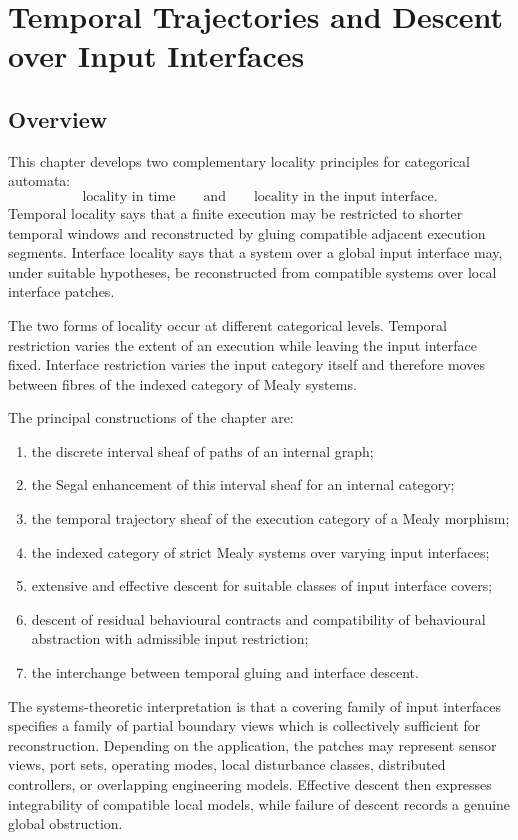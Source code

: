\chapter{Temporal Trajectories and Descent over Input Interfaces}
\label{ch:temporal-trajectories-interface-descent}

\section{Overview}
\label{sec:temporal-descent-overview}

This chapter develops two complementary locality principles for categorical
automata:
\[
    \text{locality in time}
    \qquad\text{and}\qquad
    \text{locality in the input interface}.
\]
Temporal locality says that a finite execution may be restricted to shorter
temporal windows and reconstructed by gluing compatible adjacent execution
segments. Interface locality says that a system over a global input interface
may, under suitable hypotheses, be reconstructed from compatible systems over
local interface patches.

The two forms of locality occur at different categorical levels. Temporal
restriction varies the extent of an execution while leaving the input
interface fixed. Interface restriction varies the input category itself and
therefore moves between fibres of the indexed category of Mealy systems.

The principal constructions of the chapter are:
\begin{enumerate}
    \item the discrete interval sheaf of paths of an internal graph;
    \item the Segal enhancement of this interval sheaf for an internal
    category;
    \item the temporal trajectory sheaf of the execution category of a Mealy
    morphism;
    \item the indexed category of strict Mealy systems over varying input
    interfaces;
    \item extensive and effective descent for suitable classes of input
    interface covers;
    \item descent of residual behavioural contracts and compatibility of
    behavioural abstraction with admissible input restriction;
    \item the interchange between temporal gluing and interface descent.
\end{enumerate}

The systems-theoretic interpretation is that a covering family of input
interfaces specifies a family of partial boundary views which is collectively
sufficient for reconstruction. Depending on the application, the patches may
represent sensor views, port sets, operating modes, local disturbance classes,
distributed controllers, or overlapping engineering models. Effective
descent then expresses integrability of compatible local models, while failure
of descent records a genuine global obstruction.

